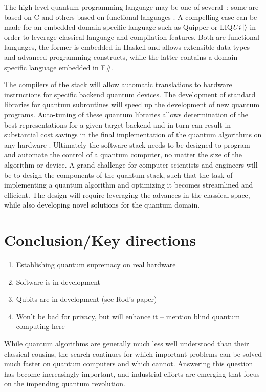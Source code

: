 \documentclass[journal]{IEEEtran}
\begin{document}
The high-level quantum programming language may be one of several~\cite{gay2006quantum}:
some are based on C \cite{omer1998procedural} and others based on functional languages \cite{green13,wecker14}.
A compelling case can be made for an embedded domain-specific language such as Quipper \cite{green13} or LIQ$Ui\ket{} $\cite{wecker14} in order to leverage classical language and compilation features.
Both are functional languages, the former is embedded in Haskell and allows extensible data types and advanced programming constructs,
while the latter contains a domain-specific language embedded in F\#.

The compilers of the stack will allow automatic translations to hardware instructions for specific backend quantum devices.  The development of standard libraries for quantum subroutines will speed up the development of new quantum programs.
Auto-tuning of these quantum libraries allows determination of the best representations for a given target backend and in turn can result in substantial cost savings in the final implementation of the quantum algorithms on any hardware  \cite{stack}.  Ultimately the software stack needs to be designed to program and automate the control of a quantum computer, no matter the size of the algorithm or device.
A grand challenge for computer scientists and engineers will be to design the components of the quantum stack, such that the task of implementing a quantum algorithm and optimizing it becomes streamlined and efficient. The design will require leveraging the advances in the classical space, while also developing novel solutions for the quantum domain.

\section{Conclusion/Key directions}
\begin{enumerate}
\item    Establishing quantum supremacy on real hardware
\item     Software is in development
\item     Qubits are in development (see Rod's paper)
\item     Won't be bad for privacy, but will enhance it -- mention blind quantum computing here
\end{enumerate}

While quantum algorithms are generally much less well understood than their classical cousins, the search continues for which important problems can be solved much faster on quantum computers and which cannot. Answering this question has become increasingly important, and industrial efforts are emerging that focus on the impending quantum revolution.
\end{document}
